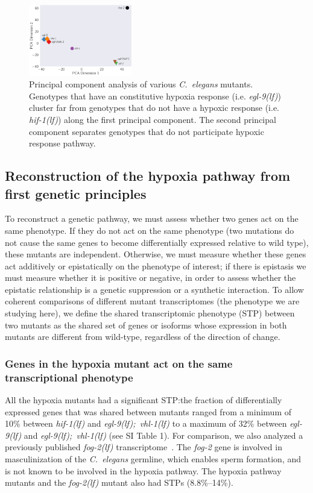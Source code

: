 \documentclass[9pt,twocolumn,twoside]{pnas-new}
\newcommand{\cel}{\emph{C.~elegans}}
\newcommand{\gene}[1]{\mbox{\emph{#1}}}
\newcommand{\fog}{\gene{fog-2(lf)}}
\newcommand{\egl}{\gene{egl-9(lf)}}
\newcommand{\eglvhl}{\gene{egl-9(lf); vhl-1(lf)}}
\newcommand{\hif}{\gene{hif-1(lf)}}
\begin{document}
\begin{figure}[tbhp]
  \centering
  \includegraphics[width=0.4\textwidth]{../final_figs/pca.pdf}
  \caption{
    Principal component analysis of various \cel{} mutants. Genotypes that have
    an constitutive hypoxia response (i.e. \egl{}) cluster far from genotypes
    that do not have a hypoxic response (i.e. \hif{}) along the first principal
    component. The second principal component separates genotypes that do not
    participate hypoxic response pathway.
  }
\label{fig:pca}
\end{figure}

\subsection*{Reconstruction of the hypoxia pathway from first genetic principles}
\label{sec:reconstruct}
To reconstruct a genetic pathway, we must assess whether two genes act on
the same phenotype. If they do not act on the same phenotype (two mutations do
not cause the same genes to become differentially expressed relative to
wild type), these mutants are independent. Otherwise, we must measure whether
these genes act additively or epistatically on the phenotype of interest; if
there is epistasis we must measure whether it is positive or negative, in order
to assess whether the epistatic relationship is a genetic suppression or a
synthetic interaction. To allow coherent comparisons of different mutant
transcriptomes (the phenotype we are studying here), we define the shared
transcriptomic phenotype (STP) between two mutants as the shared set of genes or
isoforms whose expression in both mutants are different from wild-type,
regardless of the direction of change.

\subsubsection*{Genes in the hypoxia mutant act on the same transcriptional
                phenotype}
\label{sec:phenotypes}
All the hypoxia mutants had a significant STP:\@ the fraction of differentially
expressed genes that was shared between mutants ranged from a minimum of 10\%
between \hif{} and \eglvhl{} to a maximum of 32\% between \egl{} and \eglvhl{}
(see SI Table 1).
For comparison, we also analyzed a previously published \fog{}
transcriptome~\cite{Angeles-Albores2017a}. The \gene{fog-2} gene is involved in
masculinization of the \cel{} germline, which enables sperm formation, and is
not known to be involved in the hypoxia pathway. The hypoxia pathway mutants and
the \fog{} mutant also had STPs (8.8\%--14\%).
\end{document}
